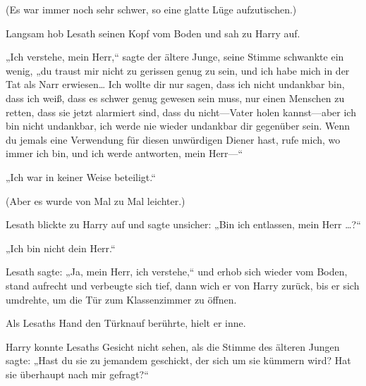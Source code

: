 (Es war immer noch sehr schwer, so eine glatte Lüge aufzutischen.)

Langsam hob Lesath seinen Kopf vom Boden und sah zu Harry auf.

„Ich verstehe, mein Herr,“ sagte der ältere Junge, seine Stimme schwankte ein wenig, „du traust mir nicht zu gerissen genug zu sein, und ich habe mich in der Tat als Narr erwiesen… Ich wollte dir nur sagen, dass ich nicht undankbar bin, dass ich weiß, dass es schwer genug gewesen sein muss, nur einen Menschen zu retten, dass sie jetzt alarmiert sind, dass du nicht—Vater holen kannst—aber ich bin nicht undankbar, ich werde nie wieder undankbar dir gegenüber sein. Wenn du jemals eine Verwendung für diesen unwürdigen Diener hast, rufe mich, wo immer ich bin, und ich werde antworten, mein Herr—“

„Ich war in keiner Weise beteiligt.“

(Aber es wurde von Mal zu Mal leichter.)

Lesath blickte zu Harry auf und sagte unsicher: „Bin ich entlassen, mein Herr …?“

„Ich bin nicht dein Herr.“

Lesath sagte: „Ja, mein Herr, ich verstehe,“ und erhob sich wieder vom Boden, stand aufrecht und verbeugte sich tief, dann wich er von Harry zurück, bis er sich umdrehte, um die Tür zum Klassenzimmer zu öffnen.

Als Lesaths Hand den Türknauf berührte, hielt er inne.

Harry konnte Lesaths Gesicht nicht sehen, als die Stimme des älteren Jungen sagte: „Hast du sie zu jemandem geschickt, der sich um sie kümmern wird? Hat sie überhaupt nach mir gefragt?“

